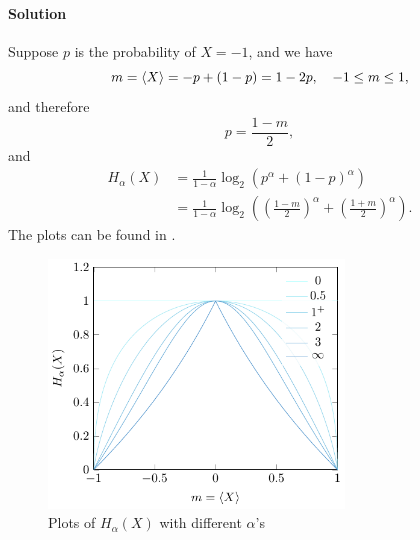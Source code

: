 \documentclass[hyperref, a4paper]{article}
\begin{document}
\paragraph{Solution} Suppose $p$ is the probability of $X = -1$,
and we have 
\begin{equation}
    m = \expval{X} = - p + (1 - p) = 1 - 2p, \quad -1 \leq m \leq 1,
\end{equation}
and therefore 
\begin{equation}
    p = \frac{1 - m}{2}, 
\end{equation}
and 
\begin{equation}
    \begin{aligned}
        H_\alpha(X) &= \frac{1}{1 - \alpha} \log_2(p^{\alpha} + (1 - p)^\alpha) \\
        &= \frac{1}{1 - \alpha} \log_2\left(
            \left( \frac{1 - m}{2} \right)^{\alpha}
            + \left( \frac{1 + m}{2} \right)^{\alpha}
        \right).
    \end{aligned}
\end{equation}
The plots can be found in .

\begin{figure}
    \centering
    \includegraphics[width=0.7\textwidth]{plots/ising-entroy-alpha.pdf}
    \caption{Plots of $H_\alpha(X)$ with different $\alpha$'s}
    \label{fig:entropy-plot}
\end{figure}
\end{document}
